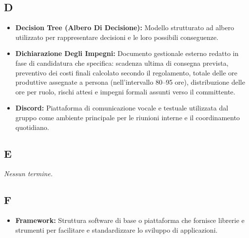 {}
\subsection*{D}
\begin{itemize}[leftmargin=*]
    \item \textbf{Decision Tree (Albero Di Decisione):} Modello strutturato ad albero utilizzato per rappresentare decisioni e le loro possibili conseguenze.
    \item \textbf{Dichiarazione Degli Impegni:} Documento gestionale esterno redatto
          in fase di candidatura che specifica: scadenza ultima di consegna prevista,
          preventivo dei costi finali calcolato secondo il regolamento, totale delle
          ore produttive assegnate a persona (nell'intervallo 80--95 ore), distribuzione
          delle ore per ruolo, rischi attesi e impegni formali assunti verso il
          committente.
    \item \textbf{Discord:} Piattaforma di comunicazione vocale e testuale utilizzata
          dal gruppo come ambiente principale per le riunioni interne e il coordinamento
          quotidiano.
\end{itemize}
 
{}
\subsection*{E}
\textit{Nessun termine.}
 
{}
\subsection*{F}
\begin{itemize}[leftmargin=*]
    \item \textbf{Framework:} Struttura software di base o piattaforma che fornisce librerie e strumenti per facilitare e standardizzare lo sviluppo di applicazioni.
\end{itemize}
 
{}
